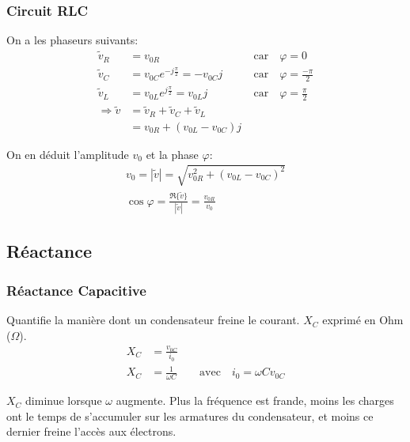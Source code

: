 \begin{multicols*}{2}
    \subsubsection{Circuit RLC}
    
    On a les phaseurs suivants:
    \begin{align*}
        \tilde v_R &= v_{0R} \qquad &\text{car} \quad \varphi = 0 \\
        \tilde v_C &= v_{0C} e^{-j\frac{\pi}{2}} = -v_{0C}j \qquad &\text{car} \quad \varphi = \frac{-\pi}{2}  \\
        \tilde v_L &= v_{0L} e^{j \frac{\pi}{2}} = v_{0L}j \qquad &\text{car} \quad \varphi = \frac{\pi}{2} \\
        \Rightarrow \tilde v &= \tilde v_R + \tilde v_C + \tilde v_L \\
        &= v_{0R} + (v_{0L} - v_{0C}) j
    \end{align*}
    
    On en déduit l'amplitude $v_0$ et la phase $\varphi$:
    \begin{align*}
        v_0 = |\tilde v| = \sqrt{ v_{0R}^2 + (v_{0L} - v_{0C})^2 } \\
        \cos \varphi = \frac{\Re \{\tilde v\}}{|\tilde v|} = \frac{v_{0R}}{v_0}
    \end{align*}
    
    \subsection{Réactance}
    
    \subsubsection{Réactance Capacitive}
    Quantifie la manière dont un condensateur freine le courant. $X_C$ exprimé en Ohm ($\Omega$).
    \begin{align*}
        X_C &= \frac{v_{0C}}{i_0} \\
        X_C &= \frac{1}{\omega C} \qquad \text{avec} \quad i_0 = \omega C v_{0C}
    \end{align*}
    
    $X_C$ diminue lorsque $\omega$ augmente. Plus la fréquence est frande, moins les charges ont le temps de s'accumuler sur les armatures du condensateur, et moins ce dernier freine l'accès aux électrons.
    
    \begin{center}
    \end{center}
    

\end{multicols*}
